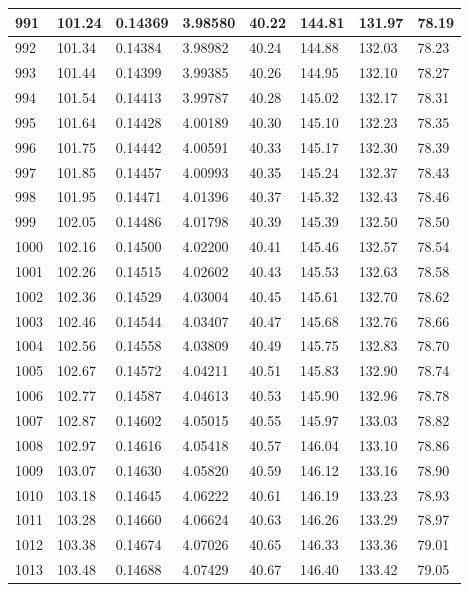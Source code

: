 \documentclass[12pt,a4paper,twoside]{article}
\begin{document}
\begin{center}
\begin{longtable}{l l l l | l l l l}
991 & 101.24 & 0.14369 & 3.98580 & 40.22 & 144.81 & 131.97 & 78.19 \\ \hline
992 & 101.34 & 0.14384 & 3.98982 & 40.24 & 144.88 & 132.03 & 78.23 \\ \hline
993 & 101.44 & 0.14399 & 3.99385 & 40.26 & 144.95 & 132.10 & 78.27 \\ \hline
994 & 101.54 & 0.14413 & 3.99787 & 40.28 & 145.02 & 132.17 & 78.31 \\ \hline
995 & 101.64 & 0.14428 & 4.00189 & 40.30 & 145.10 & 132.23 & 78.35 \\ \hline
996 & 101.75 & 0.14442 & 4.00591 & 40.33 & 145.17 & 132.30 & 78.39 \\ \hline
997 & 101.85 & 0.14457 & 4.00993 & 40.35 & 145.24 & 132.37 & 78.43 \\ \hline
998 & 101.95 & 0.14471 & 4.01396 & 40.37 & 145.32 & 132.43 & 78.46 \\ \hline
999 & 102.05 & 0.14486 & 4.01798 & 40.39 & 145.39 & 132.50 & 78.50 \\ \hline
1000 & 102.16 & 0.14500 & 4.02200 & 40.41 & 145.46 & 132.57 & 78.54 \\ \hline
1001 & 102.26 & 0.14515 & 4.02602 & 40.43 & 145.53 & 132.63 & 78.58 \\ \hline
1002 & 102.36 & 0.14529 & 4.03004 & 40.45 & 145.61 & 132.70 & 78.62 \\ \hline
1003 & 102.46 & 0.14544 & 4.03407 & 40.47 & 145.68 & 132.76 & 78.66 \\ \hline
1004 & 102.56 & 0.14558 & 4.03809 & 40.49 & 145.75 & 132.83 & 78.70 \\ \hline
1005 & 102.67 & 0.14572 & 4.04211 & 40.51 & 145.83 & 132.90 & 78.74 \\ \hline
1006 & 102.77 & 0.14587 & 4.04613 & 40.53 & 145.90 & 132.96 & 78.78 \\ \hline
1007 & 102.87 & 0.14602 & 4.05015 & 40.55 & 145.97 & 133.03 & 78.82 \\ \hline
1008 & 102.97 & 0.14616 & 4.05418 & 40.57 & 146.04 & 133.10 & 78.86 \\ \hline
1009 & 103.07 & 0.14630 & 4.05820 & 40.59 & 146.12 & 133.16 & 78.90 \\ \hline
1010 & 103.18 & 0.14645 & 4.06222 & 40.61 & 146.19 & 133.23 & 78.93 \\ \hline
1011 & 103.28 & 0.14660 & 4.06624 & 40.63 & 146.26 & 133.29 & 78.97 \\ \hline
1012 & 103.38 & 0.14674 & 4.07026 & 40.65 & 146.33 & 133.36 & 79.01 \\ \hline
1013 & 103.48 & 0.14688 & 4.07429 & 40.67 & 146.40 & 133.42 & 79.05 \\ \hline

\end{longtable}
\end{center}
\end{document}
